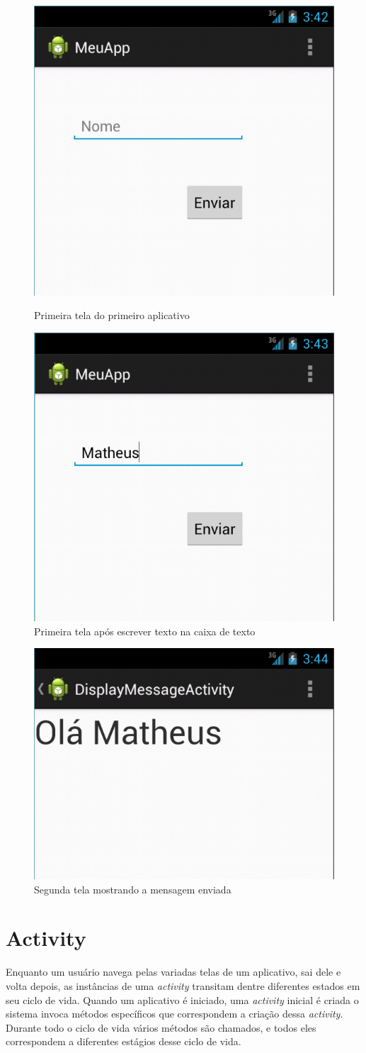 \documentclass[a4paper,12pt,brazil,doubleside]{book}
\begin{document}
\begin{singlespace}
\begin{figure}[H]
  \centering
  \includegraphics[width=.4\textwidth]{figuras/6-criando-app.png}
  \caption{Primeira tela do primeiro aplicativo}
  \label{fig:f}
  \includegraphics[width=.4\textwidth]{figuras/7-criando-app.png}
  \caption{Primeira tela após escrever texto na caixa de texto}
  \label{fig:g}
\end{figure}
\begin{figure}[H]
  \centering
  \includegraphics[width=.4\textwidth]{figuras/8-criando-app.png}
  \caption{Segunda tela mostrando a mensagem enviada}
  \label{fig:h}
\end{figure}


\section{Activity}
Enquanto um usuário navega pelas variadas telas de um aplicativo, sai dele e volta depois, as instâncias de uma \emph{activity} transitam dentre diferentes estados em seu ciclo de vida. Quando um aplicativo é iniciado, uma \emph{activity} inicial é criada o sistema invoca métodos específicos que correspondem a criação dessa \emph{activity}. Durante todo o ciclo de vida vários métodos são chamados, e todos eles correspondem a diferentes estágios desse ciclo de vida. 


\end{singlespace}
\end{document}
